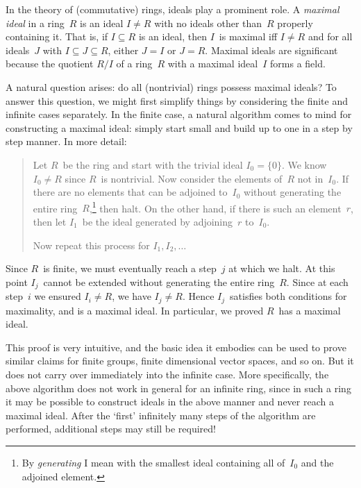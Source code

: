 \documentclass[letterpaper]{article}
\begin{document}
In the theory of (commutative) rings, ideals play a prominent role. A \emph{maximal ideal} in a ring~$R$ is an ideal $I\ne R$ with no ideals other than~$R$ properly containing it. That is, if $I\subseteq R$ is an ideal, then $I$~is maximal iff $I\ne R$ and for all ideals~$J$ with $I\subseteq J\subseteq R$, either $J=I$ or $J=R$. Maximal ideals are significant because the quotient $R/I$ of a ring~$R$ with a maximal ideal~$I$ forms a field.

A natural question arises: do all (nontrivial) rings possess maximal ideals? To answer this question, we might first simplify things by considering the finite and infinite cases separately. In the finite case, a natural algorithm comes to mind for constructing a maximal ideal: simply start small and build up to one in a step by step manner. In more detail:
\begin{quote}
Let $R$~be the ring and start with the trivial ideal $I_0=\{0\}$. We know $I_0\ne R$ since $R$~is nontrivial. Now consider the elements of~$R$ not in~$I_0$. If there are no elements that can be adjoined to~$I_0$ without generating the entire ring~$R$,\footnote{By \emph{generating} I mean with the smallest ideal containing all of~$I_0$ and the adjoined element.} then halt. On the other hand, if there is such an element~$r$, then let $I_1$~be the ideal generated by adjoining~$r$ to~$I_0$.

Now repeat this process for $I_1,I_2,\ldots$
\end{quote}
Since $R$~is finite, we must eventually reach a step~$j$ at which we halt. At this point $I_j$~cannot be extended without generating the entire ring~$R$. Since at each step~$i$ we ensured $I_i\ne R$, we have $I_j\ne R$. Hence $I_j$~satisfies both conditions for maximality, and is a maximal ideal. In particular, we proved $R$~has a maximal ideal.

This proof is very intuitive, and the basic idea it embodies can be used to prove similar claims for finite groups, finite dimensional vector spaces, and so on. But it does not carry over immediately into the infinite case. More specifically, the above algorithm does not work in general for an infinite ring, since in such a ring it may be possible to construct ideals in the above manner and never reach a maximal ideal. After the `first' infinitely many steps of the algorithm are performed, additional steps may still be required! %
\end{document}
